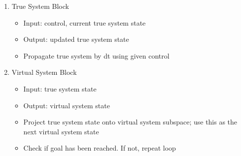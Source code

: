 \begin{enumerate}
\item True System Block
\begin{itemize}
	\item Input: control, current true system state
	\item Output: updated true system state
	\item Propagate true system by dt using given control
\end{itemize}
\item Virtual System Block
\begin{itemize}
	\item Input: true system state
	\item Output: virtual system state
	\item Project true system state onto virtual system subspace; use this as the next virtual system state
	\item Check if goal has been reached.  If not, repeat loop
\end{itemize}
\end{enumerate}